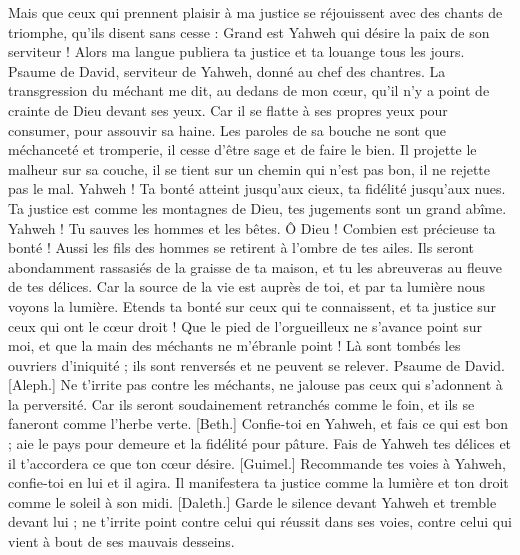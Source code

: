\begin{multicols}{2}
Mais que ceux qui prennent plaisir à ma justice se réjouissent avec des chants de triomphe, qu'ils disent sans cesse : Grand est Yahweh qui désire la paix de son serviteur !
Alors ma langue publiera ta justice et ta louange tous les jours.
\VerseOne{}Psaume de David, serviteur de Yahweh, donné au chef des chantres.
La transgression du méchant me dit, au dedans de mon cœur, qu'il n'y a point de crainte de Dieu devant ses yeux.
Car il se flatte à ses propres yeux pour consumer, pour assouvir sa haine.
Les paroles de sa bouche ne sont que méchanceté et tromperie, il cesse d'être sage et de faire le bien.
Il projette le malheur sur sa couche, il se tient sur un chemin qui n'est pas bon, il ne rejette pas le mal.
Yahweh ! Ta bonté atteint jusqu'aux cieux, ta fidélité jusqu'aux nues.
Ta justice est comme les montagnes de Dieu, tes jugements sont un grand abîme. Yahweh ! Tu sauves les hommes et les bêtes.
Ô Dieu ! Combien est précieuse ta bonté ! Aussi les fils des hommes se retirent à l'ombre de tes ailes.
Ils seront abondamment rassasiés de la graisse de ta maison, et tu les abreuveras au fleuve de tes délices.
Car la source de la vie est auprès de toi, et par ta lumière nous voyons la lumière.
Etends ta bonté sur ceux qui te connaissent, et ta justice sur ceux qui ont le cœur droit !
Que le pied de l'orgueilleux ne s'avance point sur moi, et que la main des méchants ne m'ébranle point !
Là sont tombés les ouvriers d'iniquité ; ils sont renversés et ne peuvent se relever.
\VerseOne{}Psaume de David. [Aleph.] Ne t'irrite pas contre les méchants, ne jalouse pas ceux qui s'adonnent à la perversité.
Car ils seront soudainement retranchés comme le foin, et ils se faneront comme l'herbe verte.
[Beth.] Confie-toi en Yahweh, et fais ce qui est bon ; aie le pays pour demeure et la fidélité pour pâture.
Fais de Yahweh tes délices et il t'accordera ce que ton cœur désire.
[Guimel.] Recommande tes voies à Yahweh, confie-toi en lui et il agira.
Il manifestera ta justice comme la lumière et ton droit comme le soleil à son midi.
[Daleth.] Garde le silence devant Yahweh et tremble devant lui ; ne t'irrite point contre celui qui réussit dans ses voies, contre celui qui vient à bout de ses mauvais desseins.

\end{multicols}
